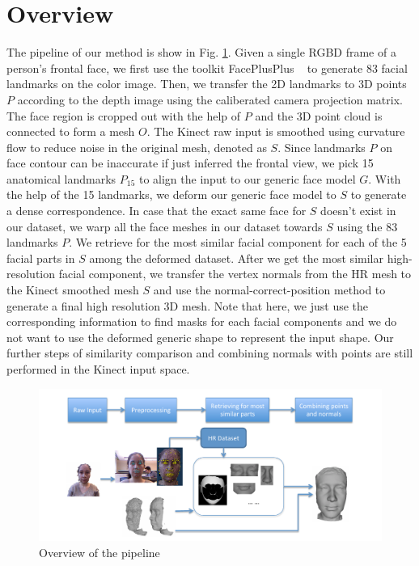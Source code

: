 \documentclass[annual]{acmsiggraph}
\begin{document}
\section{Overview}
The pipeline of our method is show in Fig. \ref{pipeline}. Given a single RGBD frame of a person's frontal face, we first use the toolkit FacePlusPlus ~\cite{face++} to generate 83 facial landmarks on the color image. Then, we transfer the 2D landmarks to 3D points $P$ according to the depth image using the caliberated camera projection matrix. The face region is cropped out with the help of $P$ and the 3D point cloud is connected to form a mesh $O$. The Kinect raw input is smoothed using curvature flow to reduce noise in the original mesh, denoted as $S$. Since landmarks $P$ on face contour can be inaccurate if just inferred the frontal view, we pick 15 anatomical landmarks $P_{15}$ to align the input to our generic face model $G$. With the help of the 15 landmarks, we deform our generic face model to $S$ to generate a dense correspondence. In case that the exact same face for $S$ doesn't exist in our dataset, we warp all the face meshes in our dataset towards $S$ using the 83 landmarks $P$. We retrieve for the most similar facial component for each of the 5 facial parts in $S$ among the deformed dataset. After we get the most similar high-resolution facial component, we transfer the vertex normals from the HR mesh to the Kinect smoothed mesh $S$ and use the normal-correct-position method to generate a final high resolution 3D mesh. Note that here, we just use the corresponding information to find masks for each facial components and we do not want to use the deformed generic shape to represent the input shape. Our further steps of similarity comparison and combining normals with points are still performed in the Kinect input space. 

\begin{figure}[htb]
  \centering
  \includegraphics[width=8in]{images/pipeline}
  \caption{Overview of the pipeline}\label{pipeline}
\end{figure}
\end{document}
